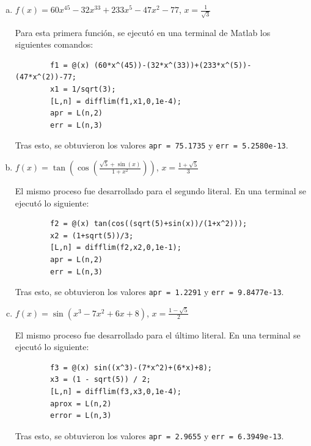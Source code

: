 \documentclass[english,notitlepage,letterpaper, 10pt]{article} %
\begin{document}
    \begin{enumerate}[a)]
      \item $f(x) = \displaystyle 60x^45-32x^33+233x^5-47x^2-77$, $x= \displaystyle \frac{1}{\sqrt{3}}$
      
      Para esta primera función, se ejecutó en una terminal de Matlab los siguientes comandos:

      \begin{lstlisting}
        f1 = @(x) (60*x^(45))-(32*x^(33))+(233*x^(5))-(47*x^(2))-77;
        x1 = 1/sqrt(3);        
        [L,n] = difflim(f1,x1,0,1e-4);
        apr = L(n,2)
        err = L(n,3)
      \end{lstlisting}

      Tras esto, se obtuvieron los valores \texttt{apr = 75.1735} y \texttt{err = 5.2580e-13}.
      
      \item $f(x) = \displaystyle \tan \left( \cos \left( \frac{\sqrt{5}+\sin(x)}{1+x^2} \right) \right)$, $x = \displaystyle \frac{1+\sqrt{5}}{3}$
      
      El mismo proceso fue desarrollado para el segundo literal. En una terminal se ejecutó lo siguiente:

      \begin{lstlisting}
        f2 = @(x) tan(cos((sqrt(5)+sin(x))/(1+x^2)));
        x2 = (1+sqrt(5))/3;
        [L,n] = difflim(f2,x2,0,1e-1);
        apr = L(n,2)
        err = L(n,3)
      \end{lstlisting}

      Tras esto, se obtuvieron los valores \texttt{apr = 1.2291} y \texttt{err =  9.8477e-13}.

      \item $f(x) = \displaystyle \sin(x^3-7x^2+6x+8)$, $x= \displaystyle \frac{1-\sqrt{5}}{2}$
      
      El mismo proceso fue desarrollado para el último literal. En una terminal se ejecutó lo siguiente:

      \begin{lstlisting}
        f3 = @(x) sin((x^3)-(7*x^2)+(6*x)+8);
        x3 = (1 - sqrt(5)) / 2;
        [L,n] = difflim(f3,x3,0,1e-4);
        aprox = L(n,2)
        error = L(n,3)
      \end{lstlisting}

      Tras esto, se obtuvieron los valores \texttt{apr = 2.9655} y \texttt{err = 6.3949e-13}.

    \end{enumerate}
\end{document}
